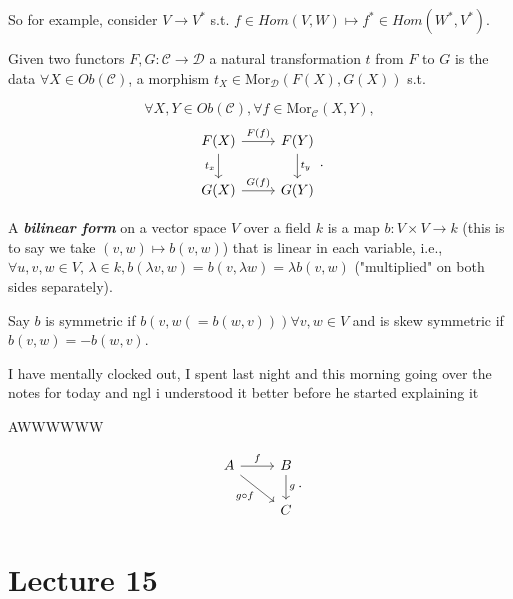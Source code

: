 \documentclass[12pt,oneside]{report}
\begin{document}
So for example, consider \( V \to V^* \) s.t. \( f \in  Hom(V,W) \mapsto f^* \in  Hom(W^*,V^*) \). 

\begin{definition}
  Given two functors \( F,G : \mathscr{C} \to  \mathscr{D} \) a natural transformation \( t \) from \( F \) to \(G\) is the data \( \forall X \in  Ob(\mathscr{C}) \), a morphism \( t_X \in  \text{Mor}_{\mathscr{D}}(F(X),G(X)) \) s.t. 

 \[
 \forall  X, Y \in  Ob(\mathscr{C}), \forall f \in  \text{Mor}_{\mathscr{C}}(X,Y), \]
 \[
\begin{tikzcd}
F(X) \arrow{r}{F(f)} \arrow[swap]{d}{t_x} & F(Y) \arrow{d}{t_y} \\%
G(X) \arrow{r}{G(f)}& G(Y)
\end{tikzcd}
.\]
  
\end{definition}

\begin{definition}
  A \textbf{\textit{bilinear form}} on a vector space \( V \) over a field \( k \) is a map \( b:V \times V \to  k \) (this is to say we take \( (v,w)\mapsto b(v,w) \)) that is linear in each variable, i.e., \( \forall u,v,w \in  V, \, \lambda \in  k, b(\lambda v,w)=b(v,\lambda w)=\lambda b(v,w) \) ("multiplied" on both sides separately). 
\end{definition}

\begin{definition}[symmetric]
  Say \( b \) is symmetric if \( b(v,w( = b(w,v) )) \forall v,w \in  V \) and is skew symmetric if \( b(v,w)=-b(w,v) \).
\end{definition}

I have mentally clocked out, I spent last night and this morning going over the notes for today and ngl i understood it better before he started explaining it 

AWWWWWW 

\[
  \begin{tikzcd}
    A \arrow{r}{f} \arrow[swap]{dr}{g\circ f} & B \arrow{d}{g} \\%
& C
\end{tikzcd}
.\]



\section{Lecture 15}
\end{document}
